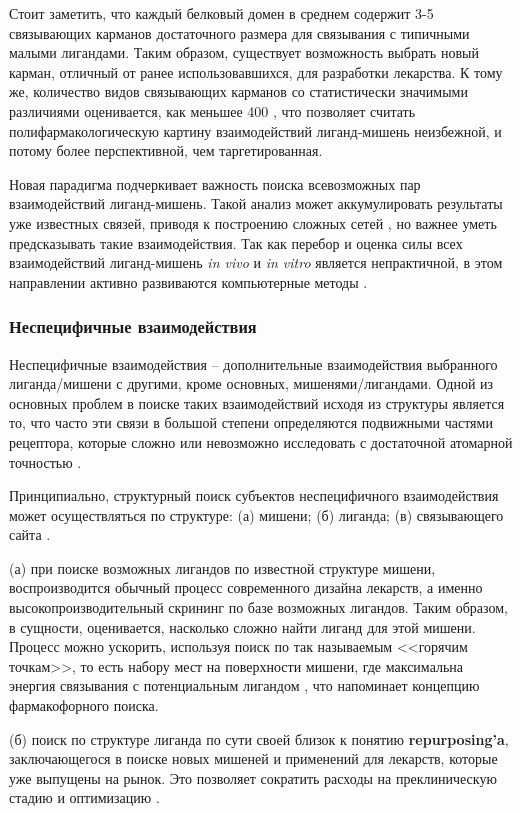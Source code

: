 \documentclass[a4paper,14pt]{article}         %
\begin{document}
Стоит заметить, что каждый белковый домен в среднем содержит 3-5 связывающих карманов достаточного размера для связывания с типичными малыми лигандами\cite{Skolnick2015}. Таким образом, существует возможность выбрать новый карман, отличный от ранее использовавшихся, для разработки лекарства. К тому же, количество видов связывающих карманов со статистически значимыми различиями оценивается, как меньшее 400 \cite{Skolnick2015}, что позволяет считать полифармакологическую картину взаимодействий лиганд-мишень неизбежной, и потому более перспективной, чем таргетированная.

Новая парадигма подчеркивает важность поиска всевозможных пар взаимодействий лиганд-мишень. Такой анализ может аккумулировать результаты уже известных связей, приводя к построению сложных сетей \cite{Anighoro2014}, но важнее уметь предсказывать такие взаимодействия. Так как перебор и оценка силы всех взаимодействий лиганд-мишень \textit{in vivo} и \textit{in vitro} является непрактичной, в этом направлении активно развиваются компьютерные методы \cite{Chaudhari}.

\subsubsection{Неспецифичные взаимодействия}
Неспецифичные взаимодействия -- дополнительные взаимодействия выбранного лиганда/мишени с другими, кроме основных, {мишенями/лигандами}. Одной из основных проблем в поиске таких взаимодействий исходя из структуры является то, что часто эти связи в большой степени определяются подвижными частями рецептора, которые сложно или невозможно исследовать с достаточной атомарной точностью \cite{Loving}.

Принципиально, структурный поиск субъектов неспецифичного взаимодействия может осуществляться по структуре: (а) мишени; (б) лиганда; (в) связывающего сайта \cite{Rognan2010}.

(а) при поиске возможных лигандов по известной структуре мишени, воспроизводится обычный процесс современного дизайна лекарств, а именно высокопроизводительный скрининг по базе возможных лигандов. Таким образом, в сущности, оценивается, насколько сложно найти лиганд для этой мишени. Процесс можно ускорить, используя поиск по так называемым <<горячим точкам>>, то есть набору мест на поверхности мишени, где максимальна энергия связывания с потенциальным лигандом \cite{Hall2015}, что напоминает концепцию фармакофорного поиска.

(б) поиск по структуре лиганда по сути своей близок к понятию \linebreak \textbf{repurposing'a}, заключающегося в поиске новых мишеней и применений для лекарств, которые уже выпущены на рынок. Это позволяет сократить расходы на преклиническую стадию и оптимизацию \cite{Hall2015, March-Vila2017}.
\end{document}
